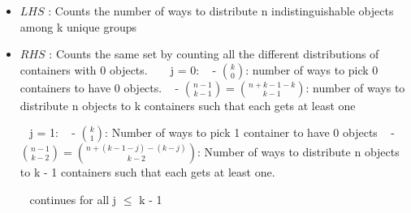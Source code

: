 \documentclass[12pt, letterpaper]{article}
\begin{document}
\begin{itemize}
    \item \( LHS \) : Counts the number of ways to distribute n indistinguishable objects among k unique groups

    \item \(RHS\) : Counts the same set by counting all the different distributions of containers with 0 objects.
    \-\ \newline
    \-\ \newline
    j = 0: 
    \-\ \newline
    - \( k \choose 0 \): number of ways to pick 0 containers to have 0 objects.
    \-\ \newline
    - \( { n - 1 \choose k -1 } = { n + k - 1 - k \choose k - 1} \): number of ways to distribute n objects to k containers such that each gets at least one
    
    \-\ \newline
    j = 1: 
    \-\ \newline
    - \( k \choose 1 \): Number of ways to pick 1 container to have 0 objects
    \-\ \newline
    - \( { n - 1 \choose k - 2 } = { n + (k - 1 - j) - (k - j) \choose k - 2} \): Number of ways to distribute n objects to k - 1 containers such that each gets at least one.

    \-\ \newline
    continues for all j \( \leq \) k - 1

\end{itemize} 
\end{document}
